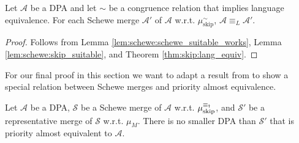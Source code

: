 \begin{cor}
	Let $\mathcal{A}$ be a DPA and let $\sim$ be a congruence relation that implies language equivalence. For each Schewe merge $\mathcal{A}'$ of $\mathcal{A}$ w.r.t. $\mu_\text{skip}^\sim$, $\mathcal{A} \equiv_L \mathcal{A}'$.
\end{cor}

\begin{proof}
	Follows from Lemma \ref{lem:schewe:schewe_suitable_works}, Lemma \ref{lem:schewe:skip_suitable}, and Theorem \ref{thm:skip:lang_equiv}.
\end{proof}

\vspace{10pt}

For our final proof in this section we want to adapt a result from \cite{Schewe2010} to show a special relation between Schewe merges and priority almost equivalence.

\begin{lem}
	Let $\mathcal{A}$ be a DPA, $\mathcal{S}$ be a Schewe merge of $\mathcal{A}$ w.r.t. $\mu_\text{skip}^{\equiv_\text{\Ankh}}$, and $\mathcal{S}'$ be a representative merge of $\mathcal{S}$ w.r.t. $\mu_M$. There is no smaller DPA than $\mathcal{S}'$ that is priority almost equivalent to $\mathcal{A}$.
\end{lem} 

